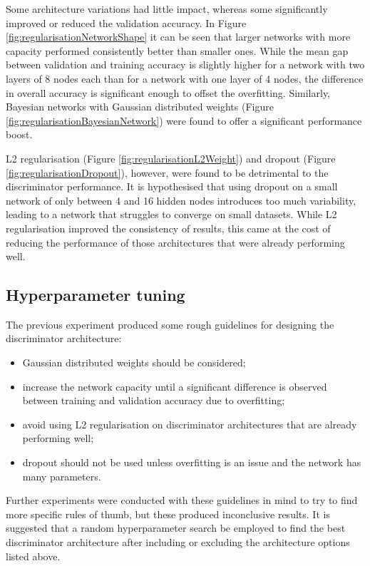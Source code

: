 \documentclass[a4paper]{article}
\begin{document}
Some architecture variations had little impact, whereas some significantly improved or reduced the validation accuracy.
In Figure \ref{fig:regularisationNetworkShape} it can be seen that larger networks with more capacity performed consistently better than smaller ones.
While the mean gap between validation and training accuracy is slightly higher for a network with two layers of 8 nodes each than for a network
with one layer of 4 nodes, the difference in overall accuracy is significant enough to offset the overfitting.
Similarly, Bayesian networks with Gaussian distributed weights (Figure \ref{fig:regularisationBayesianNetwork}) were found to offer a significant performance boost.

L2 regularisation (Figure \ref{fig:regularisationL2Weight}) and dropout (Figure \ref{fig:regularisationDropout}), however, were
found to be detrimental to the discriminator performance.
It is hypothesised that using dropout on a small network of only between 4 and 16 hidden nodes introduces
too much variability, leading to a network that struggles to converge on small datasets.
While L2 regularisation improved the consistency of results, this came at the cost of reducing the performance
of those architectures that were already performing well.

\subsection{Hyperparameter tuning}

The previous experiment produced some rough guidelines for designing the discriminator architecture:
\begin{itemize}
  \item Gaussian distributed weights should be considered;
  \item increase the network capacity until a significant difference is observed between training and validation accuracy due to overfitting;
  \item avoid using L2 regularisation on discriminator architectures that are already performing well;
  \item dropout should not be used unless overfitting is an issue and the network has many parameters.
\end{itemize}
Further experiments were conducted with these guidelines in mind to try to find more specific rules of thumb,
but these produced inconclusive results.
It is suggested that a random hyperparameter search be employed to find the best discriminator architecture
after including or excluding the architecture options listed above.
\end{document}
